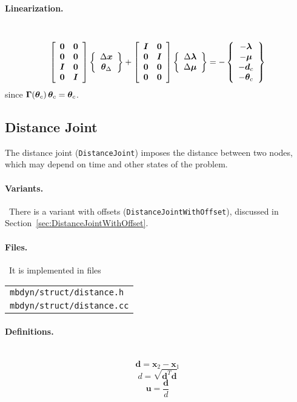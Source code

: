 \documentclass[10pt,dvips,fleqn,subeqn]{report}
\newcommand{\T}[1]{\bm{#1}}
\newcommand{\TT}[1]{\bm{#1}}
\begin{document}
\paragraph{Linearization.} \
\begin{equation}
	\sqbr{\matr{cc}{
	\TT{0} & \TT{0} \\
	\TT{0} & \TT{0} \\
	\TT{I} & \TT{0} \\
	\TT{0} & \TT{I}
	}} \cubr{\cvvect{
		\Delta\T{x} \\
		\T{\theta}_{\Delta}
	}}
	+ \sqbr{\matr{cc}{
		\TT{I} & \TT{0} \\
		\TT{0} & \TT{I} \\
		\TT{0} & \TT{0} \\
		\TT{0} & \TT{0}
	}} \cubr{\cvvect{
		\Delta\T{\lambda} \\
		\Delta\T{\mu}
	}}
	= - \cubr{\cvvect{
		- \T{\lambda} \\
		- \T{\mu} \\
		- \T{d}_c \\
		- \T{\theta}_c
	}}
\end{equation}
since $\TT{\Gamma}\!\plbr{\T{\theta}_c} \T{\theta}_c = \T{\theta}_c$.




\subsection{Distance Joint}
\label{sec:DistanceJoint}
The distance joint (\texttt{DistanceJoint}) imposes the distance between two nodes,
which may depend on time and other states of the problem.

\paragraph{Variants.} \
There is a variant with offsets (\texttt{DistanceJointWithOffset}),
discussed in Section~\ref{sec:DistanceJointWithOffset}.

\paragraph{Files.} \
It is implemented in files

\begin{tabular}{l}
\texttt{mbdyn/struct/distance.h} \\
\texttt{mbdyn/struct/distance.cc}
\end{tabular}

\paragraph{Definitions.} \
\begin{equation}
	\T{d} = \T{x}_2 - \T{x}_1
\end{equation}
\begin{equation}
	d = \sqrt{\T{d}^T \T{d}}
\end{equation}
\begin{equation}
	\T{u} = \frac{\T{d}}{d}
\end{equation}
\end{document}
